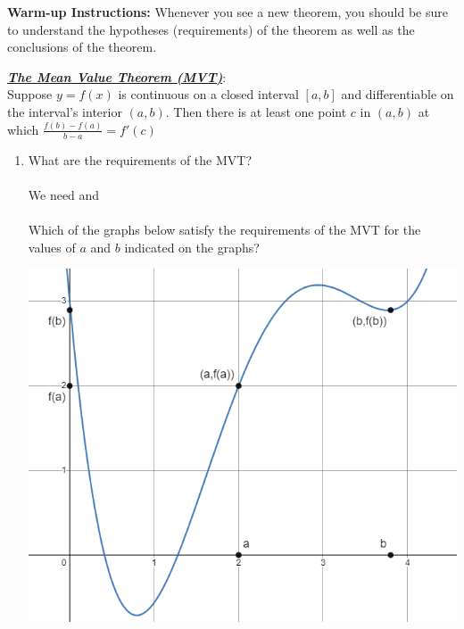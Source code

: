 \documentclass[12pt]{report}
\begin{document}
\pagestyle{empty}

\textbf{Warm-up Instructions:} Whenever you see a new theorem, you should be sure to understand the hypotheses (requirements) of the theorem as well as the conclusions of the theorem. 

\bigskip
\textbf{\emph{\underline{The Mean Value Theorem (MVT)}}}: \\
\vspace{-1pt}
Suppose $y=f(x)$ is continuous on a closed interval $[a,b]$ and differentiable on the interval's interior $(a,b)$. Then there is at least one point $c$ in $(a,b)$ at which $\displaystyle\frac{f(b)-f(a)}{b-a}=f'(c)$
\vspace{1pt}
\begin{enumerate}
\item What are the requirements of the MVT? \\
\vspace{.1in}\\
We need \underline{\hspace{3in}} and \underline{\hspace{3in}} \\
\vspace{.1in}\\
Which of the graphs below satisfy the requirements of the MVT for the values of $a$ and $b$ indicated on the graphs? \\
\begin{multicols}{2}
	\includegraphics[scale=.5]{sat-mvt.PNG}
	

\end{multicols}
\end{enumerate}
\end{document}
